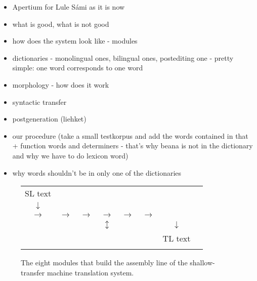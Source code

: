 \documentclass[a4paper,english,12pt]{article}
\begin{document}
\begin{spacing}{1.0}


\begin{itemize}
\item Apertium for Lule Sámi as it is now
\item what is good, what is not good
\item how does the system look like - modules
\item dictionaries - monolingual ones, bilingual ones, postediting one - pretty simple: one word corresponds to one word
\item morphology - how does it work
\item syntactic transfer
\item postgeneration (liehket)
\item our procedure (take a small testkorpus and add the words contained in that + function words and determiners - that's why beana is not in the dictionary and why we have to do lexicon word)
\item why words shouldn't be in only one of the dictionaries
\end{itemize}

\begin{figure*} {\footnotesize \setlength{\tabcolsep}{0.5mm}
\begin{center}
\begin{tabular}{cccccccc} 
\\
\parbox{0.7cm}{SL text} \\ 
$\downarrow$ \\
 $\rightarrow$ &
  $\rightarrow$ &
 $\rightarrow$ &
 $\rightarrow$ &
  $\rightarrow$ &
 $\rightarrow$ &
 \\ & & & $\updownarrow$ & &
& $\downarrow$ \\ & & &  & &
& \parbox{0.7cm}{TL text}\\\\
\end{tabular}
\end{center} }
\caption{The eight modules that build the assembly line of the
shallow-transfer machine translation system.}
\label{fg:modules}
\label{pg:modules}
\end{figure*}


\end{spacing}
\end{document}
